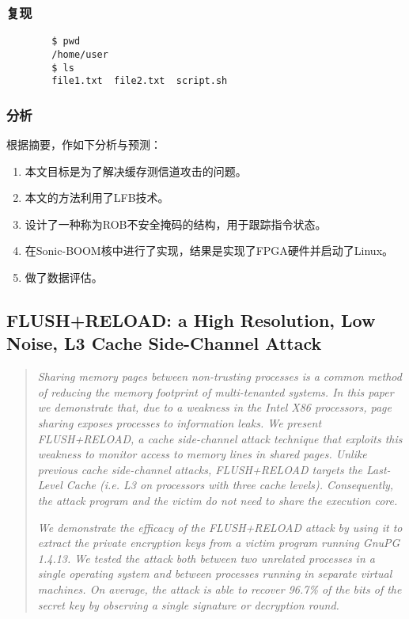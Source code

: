 \documentclass[10pt]{article}
\begin{document}
    \subsubsection{复现}
    \begin{verbatim}
        $ pwd
        /home/user
        $ ls
        file1.txt  file2.txt  script.sh
        \end{verbatim}
    \subsubsection{分析}
    
    根据摘要，作如下分析与预测：
    \begin{enumerate}
        \item 本文目标是为了解决缓存测信道攻击的问题。
        \item 本文的方法利用了LFB技术。 
        \item 设计了一种称为ROB不安全掩码的结构，用于跟踪指令状态。
        \item 在Sonic-BOOM核中进行了实现，结果是实现了FPGA硬件并启动了Linux。
        \item 做了数据评估。
    \end{enumerate}

    \newpage
    
    \subsection{FLUSH+RELOAD: a High Resolution, Low Noise, L3 Cache Side-Channel Attack\cite{184415}}\label{sec14-paper-yarom}
    

    \begin{quotation}
        \textit{Sharing memory pages between non-trusting processes
        is a common method of reducing the memory footprint
        of multi-tenanted systems. In this paper we demonstrate
        that, due to a weakness in the Intel X86 processors,
        page sharing exposes processes to information leaks. We
        present FLUSH+RELOAD, a cache side-channel attack
        technique that exploits this weakness to monitor access
        to memory lines in shared pages. Unlike previous cache
        side-channel attacks, FLUSH+RELOAD targets the Last-
        Level Cache (i.e. L3 on processors with three cache levels).
        Consequently, the attack program and the victim do
        not need to share the execution core.}

        \textit{We demonstrate the efficacy of the FLUSH+RELOAD
        attack by using it to extract the private encryption keys
        from a victim program running GnuPG 1.4.13. We tested
        the attack both between two unrelated processes in a single
        operating system and between processes running in
        separate virtual machines. On average, the attack is able
        to recover 96.7\% of the bits of the secret key by observing
        a single signature or decryption round.}
    \end{quotation}
\end{document}
